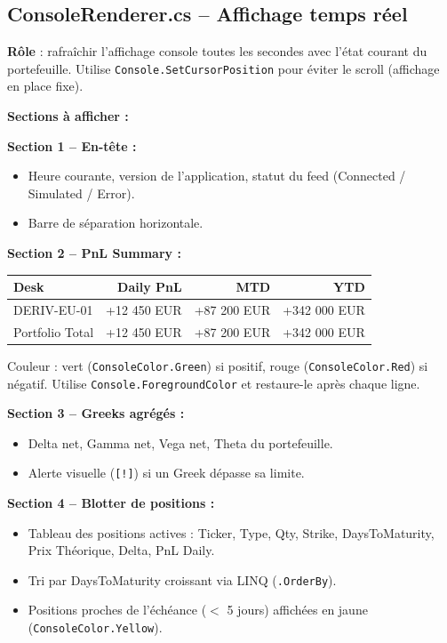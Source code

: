 \documentclass[a4paper,11pt]{article}
\newcommand{\cs}[1]{\texttt{\color{codeinline}#1}}
\begin{document}
\subsection{ConsoleRenderer.cs -- Affichage temps réel}

\textbf{Rôle} : rafraîchir l'affichage console toutes les secondes avec
l'état courant du portefeuille. Utilise \cs{Console.SetCursorPosition} pour
éviter le scroll (affichage en place fixe).

\textbf{Sections à afficher :}

\textbf{Section 1 -- En-tête :}
\begin{itemize}
  \item Heure courante, version de l'application, statut du feed
        (Connected / Simulated / Error).
  \item Barre de séparation horizontale.
\end{itemize}

\textbf{Section 2 -- PnL Summary :}

\begin{center}
\begin{tabular}{lrrr}
\toprule
\textbf{Desk} & \textbf{Daily PnL} & \textbf{MTD} & \textbf{YTD} \\
\midrule
DERIV-EU-01 & +12 450 EUR & +87 200 EUR & +342 000 EUR \\
Portfolio Total & +12 450 EUR & +87 200 EUR & +342 000 EUR \\
\bottomrule
\end{tabular}
\end{center}

Couleur : vert (\cs{ConsoleColor.Green}) si positif, rouge
(\cs{ConsoleColor.Red}) si négatif. Utilise \cs{Console.ForegroundColor}
et restaure-le après chaque ligne.

\textbf{Section 3 -- Greeks agrégés :}
\begin{itemize}
  \item Delta net, Gamma net, Vega net, Theta du portefeuille.
  \item Alerte visuelle (\cs{[!]}) si un Greek dépasse sa limite.
\end{itemize}

\textbf{Section 4 -- Blotter de positions :}
\begin{itemize}
  \item Tableau des positions actives : Ticker, Type, Qty, Strike, DaysToMaturity,
        Prix Théorique, Delta, PnL Daily.
  \item Tri par DaysToMaturity croissant via LINQ (\cs{.OrderBy}).
  \item Positions proches de l'échéance ($<$ 5 jours) affichées en
        jaune (\cs{ConsoleColor.Yellow}).
\end{itemize}
\end{document}
